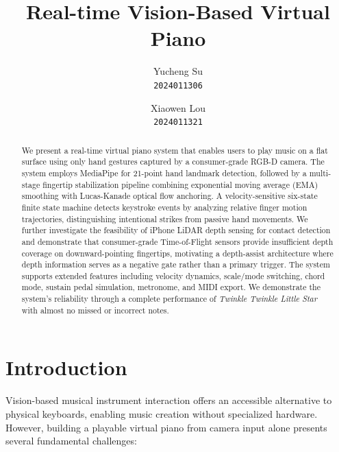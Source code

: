 \documentclass[11pt,a4paper]{article}
\title{\textbf{Real-time Vision-Based Virtual Piano}}
\author{
    Yucheng Su \\
    \texttt{2024011306} \\
    \and
    Xiaowen Lou \\
    \texttt{2024011321}
}
\date{}
\begin{document}
\maketitle

\begin{abstract}
We present a real-time virtual piano system that enables users to play music on a flat surface using only hand gestures captured by a consumer-grade RGB-D camera.
The system employs MediaPipe for 21-point hand landmark detection, followed by a multi-stage fingertip stabilization pipeline combining exponential moving average (EMA) smoothing with Lucas-Kanade optical flow anchoring.
A velocity-sensitive six-state finite state machine detects keystroke events by analyzing relative finger motion trajectories, distinguishing intentional strikes from passive hand movements.
We further investigate the feasibility of iPhone LiDAR depth sensing for contact detection and demonstrate that consumer-grade Time-of-Flight sensors provide insufficient depth coverage on downward-pointing fingertips, motivating a depth-assist architecture where depth information serves as a negative gate rather than a primary trigger.
The system supports extended features including velocity dynamics, scale/mode switching, chord mode, sustain pedal simulation, metronome, and MIDI export.
We demonstrate the system's reliability through a complete performance of \textit{Twinkle Twinkle Little Star} with almost no missed or incorrect notes.
\end{abstract}

\section{Introduction}

Vision-based musical instrument interaction offers an accessible alternative to physical keyboards, enabling music creation without specialized hardware.
However, building a playable virtual piano from camera input alone presents several fundamental challenges:
\end{document}
